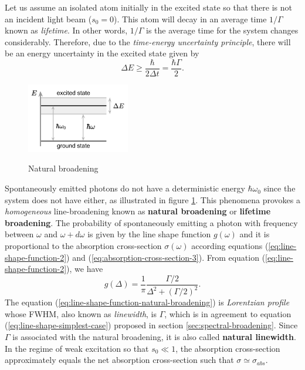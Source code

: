{Let us assume an isolated atom initially in the excited state so that there is not an incident light beam ($ s_0 = 0 $). This atom will decay in an average time $ 1/\Gamma $ known as \textit{lifetime}. In other words, $ 1 / \Gamma $ is the average time for the system changes considerably. Therefore, due to the \textit{time-energy uncertainty principle}, there will be an energy uncertainty in the excited state given by
\begin{equation}
	\Delta E \geq \frac{\hbar}{2\Delta t} = \frac{\hbar\Gamma}{2}.
\end{equation}
\begin{figure}[!ht]
	\centering
	\vspace{0pt}
	\caption{Natural broadening}
	\includegraphics[width=0.4\textwidth]{USPSC-img/natural_broadening.png}
	\vspace{5pt}
	\vspace{-10pt}
	\label{fig:natural-broadening}
\end{figure}
Spontaneously emitted photons do not have a deterministic energy $ \hbar \omega_0 $ since the system does not have either, as illustrated in figure \ref{fig:natural-broadening}. This phenomena provokes a \textit{homogeneous} line-broadening known as \textbf{natural broadening} or \textbf{lifetime broadening}. The probability of spontaneously emitting a photon with frequency between $ \omega $ and $ \omega + d\omega $ is given by the line shape function $ g(\omega) $ and it is proportional to the absorption cross-section $ \sigma(\omega) $ according equations (\ref{eq:line-shape-function-2}) and (\ref{eq:absorption-cross-section-3}). From equation (\ref{eq:line-shape-function-2}), we have
\begin{equation}
	g(\Delta) = \frac{1}{\pi} \frac{\Gamma / 2}{\Delta^2 + (\Gamma / 2)^2}.
	\label{eq:line-shape-function-natural-broadening}
\end{equation}
The equation (\ref{eq:line-shape-function-natural-broadening}) is \textit{Lorentzian profile} whose FWHM, also known as \textit{linewidth}, is $ \Gamma $, which is in agreement to equation (\ref{eq:line-shape-simplest-case}) proposed in section \ref{sec:spectral-broadening}. Since $ \Gamma $ is associated with the natural broadening, it is also called \textbf{natural linewidth}. In the regime of weak excitation so that $ s_0 \ll 1 $, the absorption cross-section approximately equals the net absorption cross-section such that $ \sigma \simeq \sigma_{abs} $.

}
